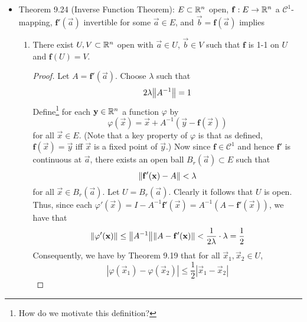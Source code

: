\documentclass[../notes.tex]{subfiles}
\begin{document}
\begin{itemize}
\begin{proof}
\begin{equation*}
            d(y,x) = d(\varphi(y),\varphi(x)) \leq c\cdot d(y,x) < d(y,x)
        \end{equation*}
        a contradiction.
    \end{proof}
    \item Theorem 9.24 (Inverse Function Theorem): $E\subset\mathbb{R}^n$ open, $\mathbf{f}:E\to\mathbb{R}^n$ a $\mathscr{C}^1$-mapping, $\mathbf{f}'(\vec{a})$ invertible for some $\vec{a}\in E$, and $\vec{b}=\mathbf{f}(\vec{a})$ implies
    \begin{enumerate}[label={(\alph*)}]
        \item There exist $U,V\subset\mathbb{R}^n$ open with $\vec{a}\in U$, $\vec{b}\in V$ such that $\mathbf{f}$ is 1-1 on $U$ and $\mathbf{f}(U)=V$.
        \begin{proof}
            Let $A=\mathbf{f}'(\vec{a})$. Choose $\lambda$ such that
            \begin{equation*}
                2\lambda\norm{A^{-1}} = 1
            \end{equation*}
            Define\footnote{How do we motivate this definition?} for each $\mathbf{y}\in\mathbb{R}^n$ a function $\varphi$ by
            \begin{equation*}
                \varphi(\vec{x}) = \vec{x}+A^{-1}(\vec{y}-\mathbf{f}(\vec{x}))
            \end{equation*}
            for all $\vec{x}\in E$. (Note that a key property of $\varphi$ is that as defined, $\mathbf{f}(\vec{x})=\vec{y}$ iff $\vec{x}$ is a fixed point of $\vec{y}$.) Now since $\mathbf{f}\in\mathscr{C}^1$ and hence $\mathbf{f}'$ is continuous at $\vec{a}$, there exists an open ball $B_r(\vec{a})\subset E$ such that
            \begin{equation*}
                \norm{\mathbf{f}'(\mathbf{x})-A} < \lambda
            \end{equation*}
            for all $\vec{x}\in B_r(\vec{a})$. Let $U=B_r(\vec{a})$. Clearly it follows that $U$ is open. Thus, since each $\varphi'(\vec{x})=I-A^{-1}\mathbf{f}'(\vec{x})=A^{-1}(A-\mathbf{f}'(\vec{x}))$, we have that
            \begin{equation*}
                \norm{\varphi'(\mathbf{x})} \leq \norm{A^{-1}}\norm{A-\mathbf{f}'(\mathbf{x})}
                < \frac{1}{2\lambda}\cdot\lambda
                = \frac{1}{2}
            \end{equation*}
            Consequently, we have by Theorem 9.19 that for all $\vec{x}_1,\vec{x}_2\in U$,
            \begin{equation*}
                |\varphi(\vec{x}_1)-\varphi(\vec{x}_2)| \leq \frac{1}{2}|\vec{x}_1-\vec{x}_2|

\end{equation*}
\end{proof}
\end{enumerate}
\end{itemize}
\end{document}
